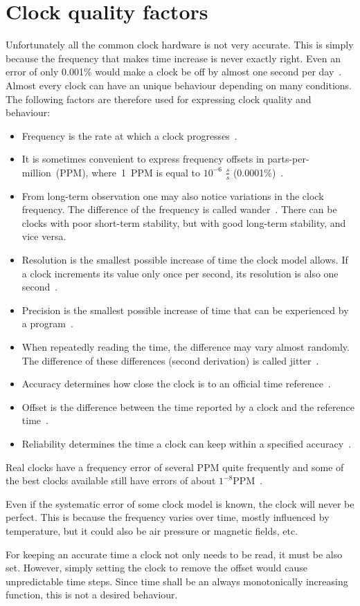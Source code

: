 \section{Clock quality factors}
Unfortunately all the common clock hardware is not very accurate.
This is simply because the frequency that makes time increase is never exactly right.
Even an error of only 0.001\% would make a clock be off by almost one second per day~\cite{ntp-faq}.
Almost every clock can have an unique behaviour depending on many conditions.
The following factors are therefore used for expressing clock quality and behaviour:
\begin{itemize}
\item
Frequency is the rate at which a clock progresses~\cite{thesis-sync}.
\item
It is sometimes convenient
to express frequency offsets in parts-per-million~(PPM), where~1~PPM
is equal to $10^{-6}$ $\frac{s}{s}$ (0.0001\%)~\cite{rfc5905}.
\item
From long-term observation one may also notice variations in the clock frequency.
The difference of the frequency is called wander~\cite{ntp-faq}.
There can be clocks with poor short-term stability, but with good long-term stability, and vice versa.
\item
Resolution is the smallest possible increase of time the clock model allows.
If a clock increments its value only once per second, its resolution is also one second~\cite{ntp-faq}.
\item
Precision is the smallest possible increase of time that can be experienced
by a program~\cite{ntp-faq}.
\item
When repeatedly reading the time, the difference may vary almost randomly.
The difference of these differences (second derivation) is called jitter~\cite{ntp-faq}.
\item
Accuracy determines how close the clock is to an official time reference~\cite{ntp-faq}.
\item
Offset is the difference between the time reported by a clock and the reference time~\cite{thesis-sync}.
\item
Reliability determines the time a clock can keep within a specified accuracy~\cite{ntp-faq}.
\end{itemize}

Real clocks have a frequency error of several PPM quite frequently
and some of the best clocks available still have errors of about $1^{-8}$PPM~\cite{ntp-faq}.

Even if the systematic error of some clock model is known, the clock will never be perfect.
This is because the frequency varies over time, mostly influenced by temperature,
but it could also be air pressure or magnetic fields, etc.

For keeping an accurate time a clock not only needs to be read, it must be also set.
However, simply setting the clock to remove the offset would cause unpredictable time steps.
Since time shall be an always monotonically increasing function, this is not a desired behaviour.
